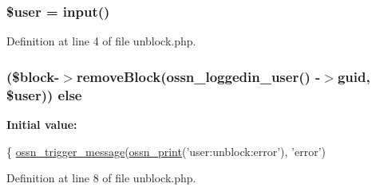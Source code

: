 \subsubsection[{\texorpdfstring{\$user}{$user}}]{\setlength{\rightskip}{0pt plus 5cm}\${\bf user} = {\bf input}(\textquotesingle{})}\hypertarget{unblock_8php_a598ca4e71b15a1313ec95f0df1027ca5}{}\label{unblock_8php_a598ca4e71b15a1313ec95f0df1027ca5}


Definition at line 4 of file unblock.\+php.

\subsubsection[{\texorpdfstring{else}{else}}]{ (\$block-\/$>$remove\+Block({\bf ossn\+\_\+loggedin\+\_\+user}() -\/$>$guid, \${\bf user})) else}\hypertarget{unblock_8php_afdb417072b9e524a61d8a3af1bd9ff14}{}\label{unblock_8php_afdb417072b9e524a61d8a3af1bd9ff14}
{\bfseries Initial value\+:}
\begin{DoxyCode}
\{
    \hyperlink{ossn_8lib_8system_8php_ab3f23f23f32f50c12e7aea0ffaccaac7}{ossn\_trigger\_message}(\hyperlink{ossn_8lib_8languages_8php_a2be5d1c4b695593a9b9067b96df2150a}{ossn\_print}(\textcolor{stringliteral}{'user:unblock:error'}), \textcolor{stringliteral}{'error'})
\end{DoxyCode}


Definition at line 8 of file unblock.\+php.

